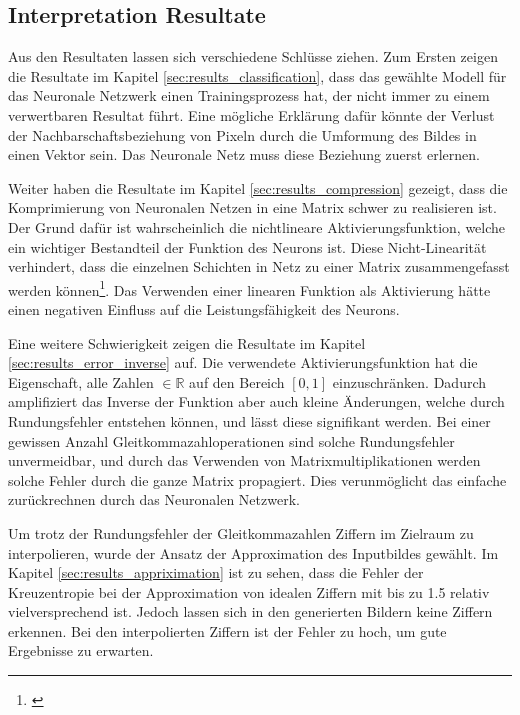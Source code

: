 \documentclass[Interploate_hadwritten_Digits.tex]{subfiles}
\begin{document}
	\subsection{Interpretation Resultate}
	Aus den Resultaten lassen sich verschiedene Schlüsse ziehen. Zum Ersten zeigen die Resultate im Kapitel \ref{sec:results_classification}, dass das gewählte Modell für das Neuronale Netzwerk einen Trainingsprozess hat, der nicht immer zu einem verwertbaren Resultat führt. Eine mögliche Erklärung  dafür könnte der Verlust der Nachbarschaftsbeziehung von Pixeln durch die Umformung des Bildes in einen Vektor sein. Das Neuronale Netz muss diese Beziehung zuerst erlernen.
	
	Weiter haben die Resultate im Kapitel \ref{sec:results_compression} gezeigt, dass die Komprimierung von Neuronalen Netzen in eine Matrix schwer zu realisieren ist. Der Grund dafür ist wahrscheinlich die nichtlineare Aktivierungsfunktion, welche ein wichtiger Bestandteil der Funktion des Neurons ist. Diese Nicht-Linearität verhindert, dass die einzelnen Schichten in Netz zu einer Matrix zusammengefasst werden können\footnote{\cite{standford-cs231n-convolutional_neuronal_networks_for_visual_recognition}}. Das Verwenden einer linearen Funktion als Aktivierung hätte einen negativen Einfluss auf die Leistungsfähigkeit des Neurons.
	
	Eine weitere Schwierigkeit zeigen die Resultate im Kapitel \ref{sec:results_error_inverse} auf. Die verwendete Aktivierungsfunktion hat die Eigenschaft, alle Zahlen $ \in \mathbb{R} $ auf den Bereich $ [0, 1] $ einzuschränken. Dadurch amplifiziert das Inverse der Funktion aber auch kleine Änderungen, welche durch Rundungsfehler entstehen können, und lässt diese signifikant werden. Bei einer gewissen Anzahl Gleitkommazahloperationen sind solche Rundungsfehler unvermeidbar, und durch das Verwenden von Matrixmultiplikationen werden solche Fehler durch die ganze Matrix propagiert. Dies verunmöglicht das einfache zurückrechnen durch das Neuronalen Netzwerk.
	
	Um trotz der Rundungsfehler der Gleitkommazahlen Ziffern im Zielraum zu interpolieren, wurde der Ansatz der Approximation des Inputbildes gewählt. Im Kapitel \ref{sec:results_appriximation} ist zu sehen, dass die Fehler der Kreuzentropie bei der Approximation von idealen Ziffern mit bis zu 1.5 relativ vielversprechend ist. Jedoch lassen sich in den generierten Bildern keine Ziffern erkennen. Bei den interpolierten Ziffern ist der Fehler zu hoch, um gute Ergebnisse zu erwarten. 
	
\end{document}
